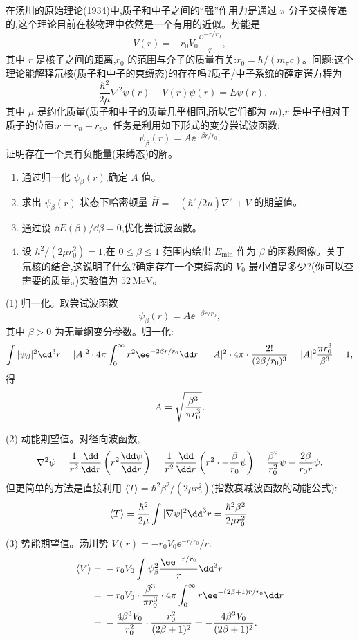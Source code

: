 \begin{question}
在汤川的原始理论(1934)中,质子和中子之间的“强”作用力是通过 $\pi$ 分子交换传递的,这个理论目前在核物理中依然是一个有用的近似。势能是
\[
V(r)=-r_0V_0\frac{\ee^{-r/r_0}}{r},
\]
其中 $r$ 是核子之间的距离,$r_0$ 的范围与介子的质量有关:$r_0=\hbar/(m_\pi c)$。问题:这个理论能解释氘核(质子和中子的束缚态)的存在吗?质子/中子系统的薛定谔方程为
\[
-\frac{\hbar^2}{2\mu}\nabla^2\psi(r)+V(r)\psi(r)=E\psi(r),
\]
其中 $\mu$ 是约化质量(质子和中子的质量几乎相同,所以它们都为 $m$),$r$ 是中子相对于质子的位置:$r=r_n-r_p$。任务是利用如下形式的变分尝试波函数:
\[
\psi_\beta(r)=A\ee^{-\beta r/r_0}.
\]
证明存在一个具有负能量(束缚态)的解。
\begin{enumerate}
\item 通过归一化 $\psi_\beta(r)$,确定 $A$ 值。
\item 求出 $\psi_\beta(r)$ 状态下哈密顿量 $\hat H=-(\hbar^2/2\mu)\nabla^2+V$ 的期望值。
\item 通过设 $\dd E(\beta)/\dd\beta=0$,优化尝试波函数。
\item 设 $\hbar^2/(2\mu r_0^2)=1$,在 $0\le\beta\le1$ 范围内绘出 $E_{\min}$ 作为 $\beta$ 的函数图像。关于氘核的结合,这说明了什么?确定存在一个束缚态的 $V_0$ 最小值是多少?(你可以查需要的质量。)实验值为 $52\,\mathrm{MeV}$。
\end{enumerate}
\begin{solution}
(1) 归一化。取尝试波函数
\[
\psi_\beta(r)=A \ee^{-\beta r/r_0},
\]
其中 $\beta>0$ 为无量纲变分参数。归一化:
\[
\int|\psi_\beta|^2\dd^3r=|A|^2\cdot4\pi\int_0^\infty r^2 \ee^{-2\beta r/r_0}\dd r
=|A|^2\cdot4\pi\cdot{2!\over(2\beta/r_0)^3}
=|A|^2{\pi r_0^3\over\beta^3}=1,
\]
得
\[
A=\sqrt{\beta^3\over\pi r_0^3}.
\]

(2) 动能期望值。对径向波函数,
\[
\nabla^2\psi={1\over r^2}{\dd\over\dd r}\left(r^2{\dd\psi\over\dd r}\right)
={1\over r^2}{\dd\over\dd r}\left(r^2\cdot-{\beta\over r_0}\psi\right)
={\beta^2\over r_0^2}\psi-{2\beta\over r_0 r}\psi.
\]
但更简单的方法是直接利用 $\langle T\rangle=\hbar^2\beta^2/(2\mu r_0^2)$(指数衰减波函数的动能公式):
\[
\langle T\rangle={\hbar^2\over2\mu}\int|\nabla\psi|^2\dd^3r
={\hbar^2\beta^2\over2\mu r_0^2}.
\]

(3) 势能期望值。汤川势 $V(r)=-r_0V_0 \ee^{-r/r_0}/r$:
\[
\begin{aligned}\langle V\rangle={}&-r_0V_0\int\psi_\beta^2{\ee^{-r/r_0}\over r}\dd^3r\\={}&-r_0V_0\cdot{\beta^3\over\pi r_0^3}\cdot4\pi\int_0^\infty r \ee^{-(2\beta+1)r/r_0}\dd r\\={}&-{4\beta^3V_0\over r_0^2}\cdot{r_0^2\over(2\beta+1)^2}=-{4\beta^3V_0\over(2\beta+1)^2}.\end{aligned}
\]


\end{solution}
\end{question}
